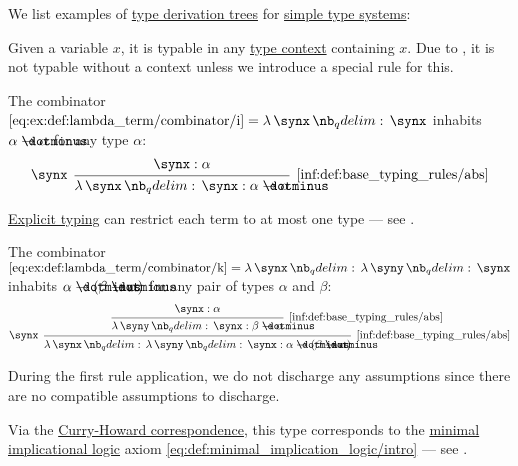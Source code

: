 \begin{example}\label{ex:def:type_derivation_tree}
  We list examples of \hyperref[def:type_derivation_tree]{type derivation trees} for \hyperref[def:simple_type_system]{simple type systems}:
  \begin{thmenum}
     Given a variable \( x \), it is typable in any \hyperref[def:type_context]{type context} containing \( x \). Due to , it is not typable without a context unless we introduce a special rule for this.

     The combinator \( \ref{eq:ex:def:lambda_term/combinator/i} = \qabs \synx \synx \) inhabits \( \alpha \synimplies \alpha \) for any type \( \alpha \):
    \begin{equation*}
      \begin{prooftree}
        \hypo{ \synx: \alpha }
        \infer[left label=\( \synx \)]1[\ref{inf:def:base_typing_rules/abs}]{ \qabs \synx \synx: \alpha \synimplies \alpha }
      \end{prooftree}
    \end{equation*}

    \hyperref[rem:explicit_and_implicit_typing]{Explicit typing} can restrict each term to at most one type --- see .

     The combinator \( \ref{eq:ex:def:lambda_term/combinator/k} = \qabs \synx \qabs \syny \synx \) inhabits \( \alpha \synimplies (\beta \synimplies \alpha) \) for any pair of types \( \alpha \) and \( \beta \):
    \begin{equation*}
      \begin{prooftree}
        \hypo{ \synx: \alpha }
        \infer1[\ref{inf:def:base_typing_rules/abs}]{ \qabs \syny \synx: \beta \synimplies \alpha }
        \infer[left label=\( \synx \)]1[\ref{inf:def:base_typing_rules/abs}]{ \qabs \synx \qabs \syny \synx: \alpha \synimplies (\beta \synimplies \alpha) }
      \end{prooftree}
    \end{equation*}

    During the first rule application, we do not discharge any assumptions since there are no compatible assumptions to discharge.

    Via the \hyperref[con:curry_howard_correspondence]{Curry-Howard correspondence}, this type corresponds to the \hyperref[def:minimal_implication_logic]{minimal implicational logic} axiom \eqref{eq:def:minimal_implication_logic/intro} --- see .


\end{thmenum}
\end{example}
